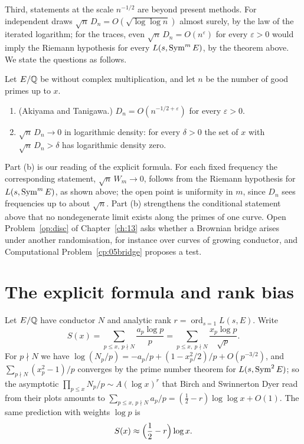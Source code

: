 Third, statements at the scale $n^{-1/2}$ are beyond present methods. For independent draws $\sqrt n\,D_n = O(\sqrt{\log\log n})$ almost surely, by the law of the iterated logarithm; for the traces, even $\sqrt n\,D_n = O(n^{\varepsilon})$ for every $\varepsilon>0$ would imply the Riemann hypothesis for every $L(s,\operatorname{Sym}^mE)$, by the theorem above. We state the questions as follows.

\begin{conjecture}\label{conj:05bridge}
Let $E/\mathbb{Q}$ be without complex multiplication, and let $n$ be the number of good primes up to $x$.
\begin{enumerate}[label=(\alph*)]
\item (Akiyama and Tanigawa.) $D_n = O(n^{-1/2+\varepsilon})$ for every $\varepsilon>0$.
\item $\sqrt n\,D_n\to0$ in logarithmic density: for every $\delta>0$ the set of $x$ with $\sqrt n\,D_n>\delta$ has logarithmic density zero.
\end{enumerate}
\end{conjecture}

Part (b) is our reading of the explicit formula. For each fixed frequency the corresponding statement, $\sqrt n\,W_m\to0$, follows from the Riemann hypothesis for $L(s,\operatorname{Sym}^mE)$, as shown above; the open point is uniformity in $m$, since $D_n$ sees frequencies up to about $\sqrt n$. Part (b) strengthens the conditional statement above that no nondegenerate limit exists along the primes of one curve. Open Problem~\ref{op:disc} of Chapter~\ref{ch:13} asks whether a Brownian bridge arises under another randomisation, for instance over curves of growing conductor, and Computational Problem~\ref{cp:05bridge} proposes a test.

\section{The explicit formula and rank bias}\label{sec:05bias}

Let $E/\mathbb{Q}$ have conductor $N$ and analytic rank $r = \operatorname{ord}_{s=1}L(s,E)$. Write
\[
S(x) = \sum_{p\le x,\ p\nmid N}\frac{a_p\log p}{p} = \sum_{p\le x,\ p\nmid N}\frac{x_p\log p}{\sqrt p}.
\]
For $p\nmid N$ we have $\log(N_p/p) = -a_p/p + (1 - x_p^2/2)/p + O(p^{-3/2})$, and $\sum_{p\nmid N}(x_p^2 - 1)/p$ converges by the prime number theorem for $L(s,\operatorname{Sym}^2E)$; so the asymptotic $\prod_{p\le x}N_p/p\sim A(\log x)^r$ that Birch and Swinnerton Dyer read from their plots \cite{bsd1965} amounts to $\sum_{p\le x,\,p\nmid N}a_p/p = (\frac12 - r)\log\log x + O(1)$. The same prediction with weights $\log p$ is
\[
S(x) \approx \Bigl(\frac12 - r\Bigr)\log x .
\]

